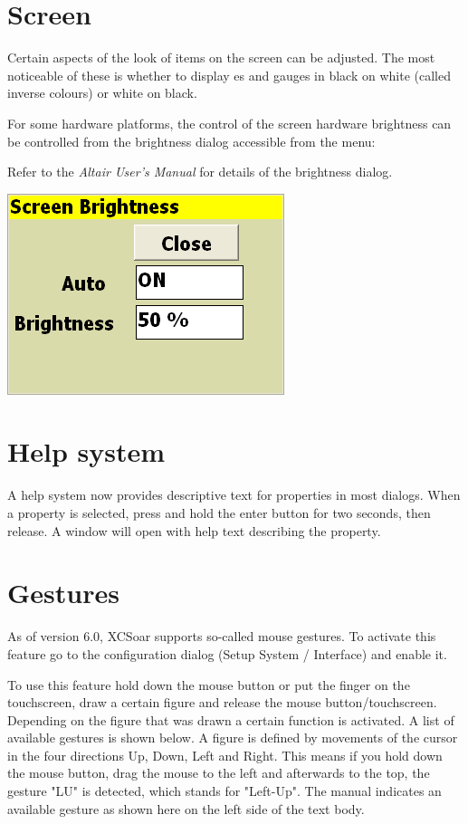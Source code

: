 \documentclass[a4paper,12pt]{refrep}
\begin{document}
\section{Screen}

Certain aspects of the look of items on the screen can be adjusted.
The most noticeable of these is whether to display {\InfoBox}es and
gauges in black on white (called inverse colours) or white on black.

For some hardware platforms, the control of the screen hardware 
brightness can be controlled from the brightness dialog
accessible from the menu:
\begin{quote}
\blink{}\blink{}
\end{quote}

Refer to the {\em Altair User's Manual} for details of the brightness
dialog.

\begin{center}
\includegraphics[angle=0,width=0.45\linewidth,keepaspectratio='true']{figures/brightness.png}
\end{center}

\section{Help system}
  A help system now provides descriptive text for properties in
  most dialogs.  When a property is selected, press and hold the
  enter button for two seconds, then release.  A window will open with
  help text describing the property.

\section{Gestures}
  As of version 6.0, XCSoar supports so-called mouse gestures. To activate 
  this feature go to the configuration dialog (Setup System / Interface) and
  enable it.

  To use this feature hold down the mouse button or put the finger on the 
  touchscreen, draw a certain figure and release the mouse 
  button/touchscreen. Depending on the figure that was drawn 
  a certain function is activated. A list of available gestures is 
  shown below. A figure is defined by movements of the 
  cursor in the four directions Up, Down, Left and Right. This means if 
  you hold down the mouse button, drag the mouse to the left 
  and afterwards to the top,  the gesture "LU" is detected,
  which stands for "Left-Up". The manual indicates an available gesture as shown
  here on the left side of the text body.
\end{document}
